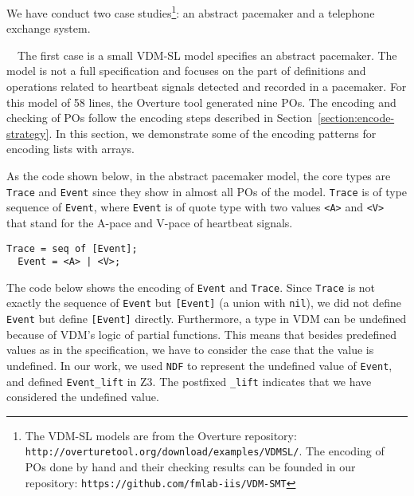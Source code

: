 We have conduct two case studies\footnote{The VDM-SL models are from the Overture repository: {\tt http://overturetool.org/download/examples/VDMSL/}. The encoding of POs done by hand and their checking results can be founded in our repository: {\tt https://github.com/fmlab-iis/VDM-SMT}}: an abstract pacemaker and a telephone exchange system.


 ~~The first case is a small VDM-SL model specifies an abstract pacemaker. The model is not a full specification and focuses on the part of definitions and operations related to heartbeat signals detected and recorded in a pacemaker. For this model of 58 lines, the Overture tool generated nine POs. The encoding and checking of POs follow the encoding steps described in Section~\ref{section:encode-strategy}. In this section, we demonstrate some of the encoding patterns for encoding lists with arrays.

As the code shown below, in the abstract pacemaker model, the core types are {\tt Trace} and {\tt Event} since they show in almost all POs of the model. {\tt Trace} is of type sequence of {\tt Event}, where {\tt Event} is of quote type with two values {\tt <A>} and {\tt <V>} that stand for the A-pace and V-pace of heartbeat signals. 

\medskip
\begin{mdframed}[roundcorner=5pt]
\begin{Verbatim}[fontsize=\small]
  Trace = seq of [Event];
  Event = <A> | <V>;
\end{Verbatim}
\end{mdframed}
\medskip

The code below shows the encoding of {\tt Event} and {\tt Trace}. Since {\tt Trace} is not exactly the sequence of {\tt Event} but {\tt [Event]} (a union with {\tt nil}), we did not define {\tt Event} but define {\tt [Event]} directly. Furthermore, a type in VDM can be undefined because of VDM's logic of partial functions. This means that besides predefined values as in the specification, we have to consider the case that the value is undefined. In our work, we used {\tt NDF} to represent the undefined value of {\tt Event}, and defined {\tt Event\_lift} in Z3. The postfixed {\tt \_lift} indicates that we have considered the undefined value.

